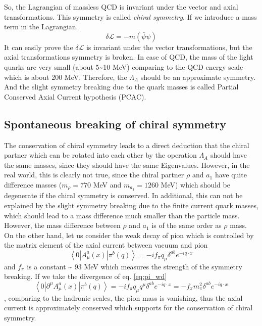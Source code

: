 So, the Lagrangian of massless QCD is invariant under the vector and
axial transformations. This symmetry is called \emph{chiral symmetry}.
If we introduce a mass term in the Lagrangian.
\begin{equation}
\delta\mathcal{L}=-m(\bar{\psi}\psi)
\end{equation}
It can easily prove the $\delta\mathcal{L}$ is invariant under the
vector transformations, but the axial transformations symmetry is
broken. In case of QCD, the mass of the light quarks are very small
(about 5\textasciitilde{}10 MeV) comparing to the QCD energy scale
which is about 200 MeV. Therefore, the $\Lambda_{A}$ should be an
approximate symmetry. And the slight symmetry breaking due to the
quark masses is called Partial Conserved Axial Current hypothesis
(PCAC).


\subsection{Spontaneous breaking of chiral symmetry}

The conservation of chiral symmetry leads to a direct deduction that
the chiral partner which can be rotated into each other by the operation
$\Lambda_{A}$ should have the same masses, since they should have
the same Eigenvalues. However, in the real world, this is clearly
not true, since the chiral partner $\rho$ and $a_{1}$ have quite
difference masses ($m_{\rho}=770$ MeV and $m_{a_{1}}=1260$ MeV)
which should be degenerate if the chiral symmetry is conserved. In
additional, this can not be explained by the slight symmetry breaking
due to the finite current quark masses, which should lead to a mass
difference much smaller than the particle mass. However, the mass
difference between $\rho$ and $a_{1}$ is of the same order as $\rho$
mass. On the other hand, let us consider the weak decay of pion which
is controlled by the matrix element of the axial current between vacuum
and pion 
\begin{equation}
\left\langle 0|A_{\mu}^{a}(x)|\pi^{b}(q)\right\rangle =-if_{\pi}q_{\mu}\delta^{ab}e^{-iq\cdot x}\label{eq:pi_wd}
\end{equation}
and $f_{\pi}$ is a constant \textasciitilde{} 93 MeV which measures
the strength of the symmetry breaking. If we take the divergence of
eq. \ref{eq:pi_wd}
\begin{equation}
\left\langle 0|\partial^{\mu}A_{\mu}^{a}(x)|\pi^{b}(q)\right\rangle =-if_{\pi}q_{\mu}q^{\mu}\delta^{ab}e^{-iq\cdot x}=-f_{\pi}m_{\pi}^{2}\delta^{ab}e^{-iq\cdot x}
\end{equation}
, comparing to the hadronic scales, the pion mass is vanishing, thus
the axial current is approximately conserved which supports for the
conservation of chiral symmetry. 

